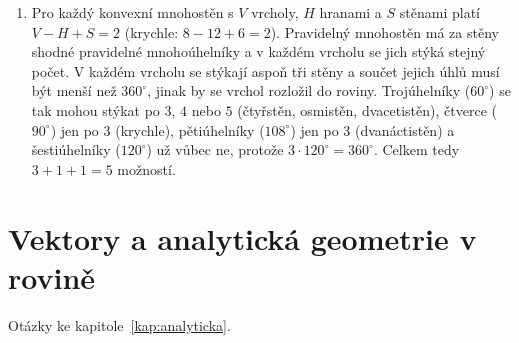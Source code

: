 \begin{enumerate}[label=\textbf{\arabic*.}, leftmargin=*, itemsep=0.8em]
  \item {}
  Pro každý konvexní mnohostěn s $V$ vrcholy, $H$ hranami a $S$ stěnami platí $V - H + S = 2$ (krychle: $8 - 12 + 6 = 2$). Pravidelný mnohostěn má za stěny shodné pravidelné mnohoúhelníky a v každém vrcholu se jich stýká stejný počet. V každém vrcholu se stýkají aspoň tři stěny a součet jejich úhlů musí být menší než $360^\circ$, jinak by se vrchol rozložil do roviny. Trojúhelníky ($60^\circ$) se tak mohou stýkat po $3$, $4$ nebo $5$ (čtyřstěn, osmistěn, dvacetistěn), čtverce ($90^\circ$) jen po $3$ (krychle), pětiúhelníky ($108^\circ$) jen po $3$ (dvanáctistěn) a šestiúhelníky ($120^\circ$) už vůbec ne, protože $3\cdot 120^\circ = 360^\circ$. Celkem tedy $3 + 1 + 1 = 5$ možností. 
\end{enumerate}

\section{Vektory a analytická geometrie v rovině}

Otázky ke kapitole~\ref{kap:analyticka}.

